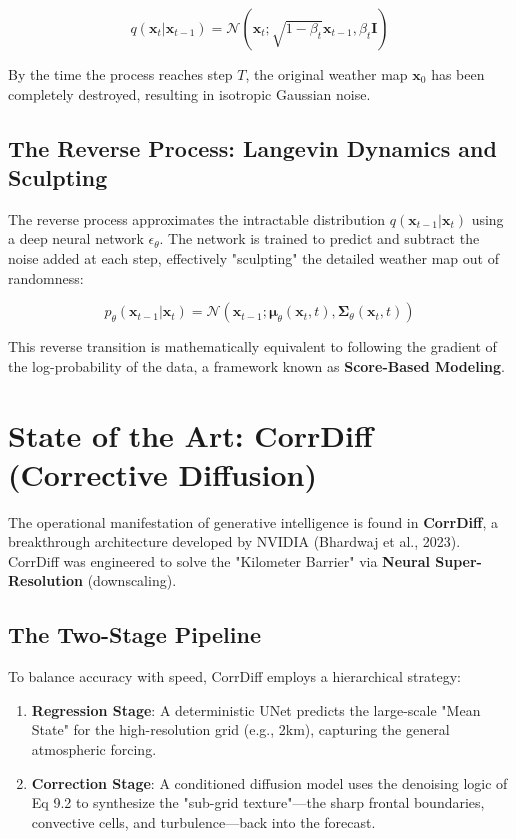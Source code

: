 \begin{equation}
q(\mathbf{x}_t | \mathbf{x}_{t-1}) = \mathcal{N}(\mathbf{x}_t; \sqrt{1 - \beta_t} \mathbf{x}_{t-1}, \beta_t \mathbf{I})
\end{equation}

By the time the process reaches step $T$, the original weather map $\mathbf{x}_0$ has been completely destroyed, resulting in isotropic Gaussian noise.

\subsection{The Reverse Process: Langevin Dynamics and Sculpting}
The reverse process approximates the intractable distribution $q(\mathbf{x}_{t-1} | \mathbf{x}_t)$ using a deep neural network $\epsilon_\theta$. The network is trained to predict and subtract the noise added at each step, effectively "sculpting" the detailed weather map out of randomness:

\begin{equation}
p_\theta(\mathbf{x}_{t-1} | \mathbf{x}_t) = \mathcal{N}(\mathbf{x}_{t-1}; \boldsymbol{\mu}_\theta(\mathbf{x}_t, t), \mathbf{\Sigma}_\theta(\mathbf{x}_t, t))
\end{equation}

This reverse transition is mathematically equivalent to following the gradient of the log-probability of the data, a framework known as \textbf{Score-Based Modeling}.

\section{State of the Art: CorrDiff (Corrective Diffusion)}

The operational manifestation of generative intelligence is found in \textbf{CorrDiff}, a breakthrough architecture developed by NVIDIA (Bhardwaj et al., 2023). CorrDiff was engineered to solve the "Kilometer Barrier" via \textbf{Neural Super-Resolution} (downscaling). 

\subsection{The Two-Stage Pipeline}
To balance accuracy with speed, CorrDiff employs a hierarchical strategy:
\begin{enumerate}
    \item \textbf{Regression Stage}: A deterministic UNet predicts the large-scale "Mean State" for the high-resolution grid (e.g., 2km), capturing the general atmospheric forcing.
    \item \textbf{Correction Stage}: A conditioned diffusion model uses the denoising logic of Eq 9.2 to synthesize the "sub-grid texture"—the sharp frontal boundaries, convective cells, and turbulence—back into the forecast.
\end{enumerate}


